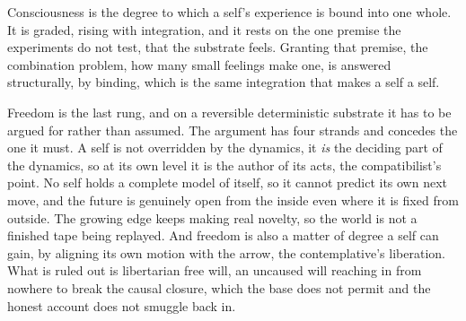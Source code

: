 \begin{principle}
Consciousness is the degree to which a self's experience is bound into one whole. It is graded, rising with integration, and it rests on the one premise the experiments do not test, that the substrate feels. Granting that premise, the combination problem, how many small feelings make one, is answered structurally, by binding, which is the same integration that makes a self a self.
\end{principle}

Freedom is the last rung, and on a reversible deterministic substrate it has to be argued for rather than assumed. The argument has four strands and concedes the one it must. A self is not overridden by the dynamics, it \emph{is} the deciding part of the dynamics, so at its own level it is the author of its acts, the compatibilist's point. No self holds a complete model of itself, so it cannot predict its own next move, and the future is genuinely open from the inside even where it is fixed from outside. The growing edge keeps making real novelty, so the world is not a finished tape being replayed. And freedom is also a matter of degree a self can gain, by aligning its own motion with the arrow, the contemplative's liberation. What is ruled out is libertarian free will, an uncaused will reaching in from nowhere to break the causal closure, which the base does not permit and the honest account does not smuggle back in.
